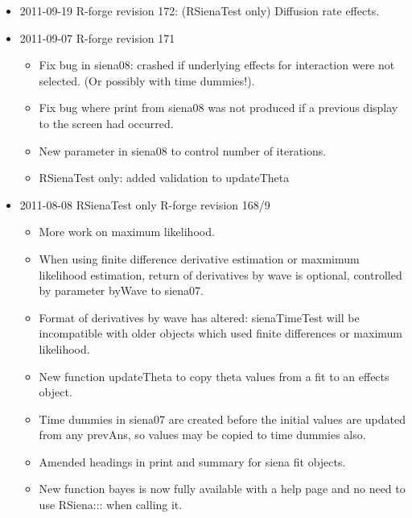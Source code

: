 \documentclass[a4paper,fleqn,11pt]{article}
\newcommand{\+}{\, + \,}
\newcommand{\sfn}[1]{\textsf{#1}}
\begin{document}
{\begin{small}
\begin{itemize}
\begin{itemize}
\item Fix bug with multiple symmetric networks.
\item Limit constraints to be between both symmetric or non-symmetric networks
\item Added scripts to package (RSienaTest only)
\item siena07 called with batch=FALSE no longer crashes if called on mac or
linux with no X11 available. (RSienaTest only)
\end{itemize}
\item 2011-09-19 R-forge revision 172: (RSienaTest only) Diffusion rate effects.
\item 2011-09-07 R-forge revision 171
\begin{itemize}
\item Fix bug in siena08: crashed if underlying effects for interaction were not
  selected. (Or possibly with time dummies!).
\item Fix bug where print from siena08 was not produced if a previous display to
  the screen had occurred.
\item New parameter in siena08 to control number of iterations.
\item RSienaTest only: added validation to updateTheta
\end{itemize}
\item 2011-08-08 RSienaTest only R-forge revision 168/9
\begin{itemize}
\item More work on maximum likelihood.
\item When using finite difference derivative estimation or maxmimum likelihood
  estimation, return of derivatives by wave is optional, controlled by parameter
  byWave to siena07.
\item Format of derivatives by wave has altered: sienaTimeTest will be
  incompatible with older objects which used finite differences or maximum
  likelihood.
\item New function \sfn{updateTheta} to copy theta values from a fit to an
  effects object.
\item Time dummies in siena07 are created before the initial values are updated
  from any prevAns, so values may be copied to time dummies also.
\item Amended headings in print and summary for siena fit objects.
\item New function \sfn{bayes} is now fully available with a help page and no
  need to use RSiena::: when calling it.

\end{itemize}
\end{itemize}
\end{small}}
\end{document}
